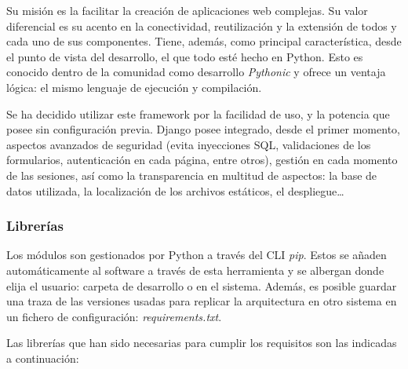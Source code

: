Su misión es la facilitar la creación de aplicaciones web complejas. Su valor diferencial es su acento en la conectividad, reutilización y la extensión de todos y cada uno de sus componentes. Tiene, además, como principal característica, desde el punto de vista del desarrollo, el que todo esté hecho en Python. Esto es conocido dentro de la comunidad como desarrollo \textit{Pythonic} y ofrece un ventaja lógica: el mismo lenguaje de ejecución y compilación.

Se ha decidido utilizar este framework por la facilidad de uso, y la potencia que posee sin configuración previa. Django posee integrado, desde el primer momento, aspectos avanzados de seguridad (evita inyecciones SQL, validaciones de los formularios, autenticación en cada página, entre otros), gestión en cada momento de las sesiones, así como la transparencia en multitud de aspectos: la base de datos utilizada, la localización de los archivos estáticos, el despliegue\dots

\subsubsection{Librerías}
Los módulos son gestionados por Python a través del CLI \textit{pip}. Estos se añaden automáticamente al software a través de esta herramienta y se albergan donde elija el usuario: carpeta de desarrollo o en el sistema. Además, es posible guardar una traza de las versiones usadas para replicar la arquitectura en otro sistema en un fichero de configuración: \textit{requirements.txt}.

Las librerías que han sido necesarias para cumplir los requisitos son las indicadas a continuación:

